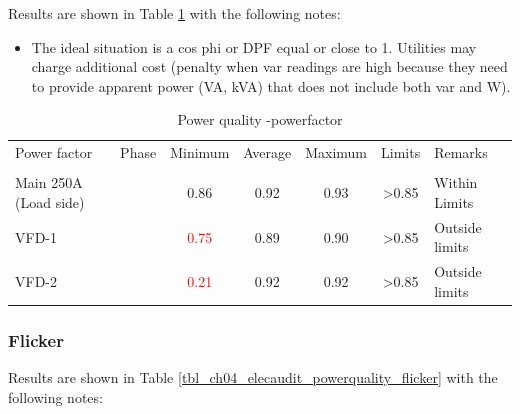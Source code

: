 Results are shown in Table \ref{tbl_ch04_elecaudit_powerquality_powerfactor} with the following notes:

\begin{itemize}
	\item The ideal situation is a cos phi or DPF equal or close to 1. Utilities may charge additional cost (penalty when var readings are high because they need to provide apparent power (VA, kVA) that does not include both var and W).
	
\end{itemize}

\begin{table}[!htb]
	\caption{Power quality -powerfactor}
	\label{tbl_ch04_elecaudit_powerquality_powerfactor}
	{\scriptsize
	
	\begin{tabular}{l|l|l|l|l|l|l}
		\hline
		Power factor & \multicolumn{1}{c|}{Phase} & \multicolumn{1}{c|}{Minimum} & \multicolumn{1}{c|}{Average} & \multicolumn{1}{c|}{Maximum} & \multicolumn{1}{c|}{Limits} & Remarks \\ 
		& \multicolumn{1}{c|}{} & \multicolumn{1}{c|}{} & \multicolumn{1}{c|}{} & \multicolumn{1}{c|}{} & \multicolumn{1}{c|}{} &  \\ 
		\hline
		Main 250A (Load side) & \multicolumn{1}{c|}{} & \multicolumn{1}{c|}{0.86} & \multicolumn{1}{c|}{0.92} & \multicolumn{1}{c|}{0.93} & \multicolumn{1}{c|}{>0.85} & Within  Limits \\ 
		\hline
		VFD-1 & \multicolumn{1}{c|}{} & \multicolumn{1}{c|}{\textcolor{red}{0.75}} & \multicolumn{1}{c|}{0.89} & \multicolumn{1}{c|}{0.90} & \multicolumn{1}{c|}{>0.85} & Outside limits \\ 
		\hline
		VFD-2 & \multicolumn{1}{c|}{} & \multicolumn{1}{c|}{\textcolor{red}{0.21}} & \multicolumn{1}{c|}{0.92} & \multicolumn{1}{c|}{0.92} & \multicolumn{1}{c|}{>0.85} & Outside limits \\ 
	\hline
\end{tabular}

			
		
	}%
\end{table}




\subsubsection{Flicker}

Results are shown in Table \ref{tbl_ch04_elecaudit_powerquality_flicker} with the following notes:

